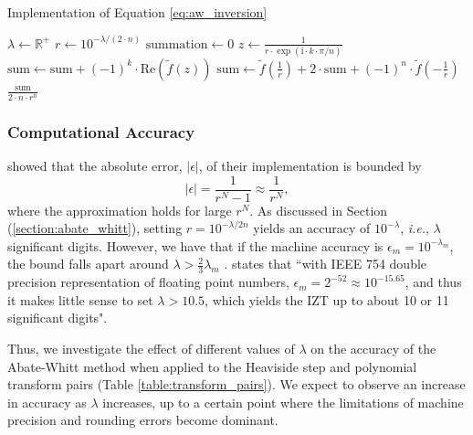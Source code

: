 \documentclass[a4paper]{report}
\begin{document}
\begin{algorithm}[H]
    \caption{Implementation of Equation \ref{eq:aw_inversion}}
    \label{algo:abate_whitt}
    \begin{algorithmic}[1]
        \State $\lambda \gets \mathbb{R}^+$
        \State $r \gets 10^{-\lambda / (2 \cdot n)}$
        \State $\text{summation} \gets 0$
            \State $z \gets \frac{1}{r \cdot \exp(\text{i} \cdot k \cdot \pi / n)}$
            \State $\text{sum} \gets \text{sum} + (-1)^k \cdot \text{Re}(\tilde{f}(z))$
        \EndFor
        \State $\text{sum} \gets \tilde{f}(\frac{1}{r}) + 2 \cdot \text{sum} + (-1)^n \cdot \tilde{f}(-\frac{1}{r})$
        \State \Return $\frac{\text{sum}}{2 \cdot n \cdot r^n}$
    \EndProcedure
    \end{algorithmic}
\end{algorithm}

\subsubsection{Computational Accuracy}\label{sec:aw_accuracy}
\citet{AbateWhitt1992a, AbateWhitt1992b} showed that the absolute error, $|\epsilon |$, of their implementation is bounded by
\begin{equation}
	| \epsilon | = \frac{1}{r^N - 1} \approx \frac{1}{r^N},
\end{equation}
where the approximation holds for large $r^N$. As discussed in Section (\ref{section:abate_whitt}), setting $r=10^{-\lambda / 2n}$  yields an accuracy of $10^{-\lambda}$, \textit{i.e.}, $\lambda$ significant digits. However, we have that if the machine accuracy is $\epsilon_m = 10^{-\lambda_m}$, the bound falls apart around $\lambda > \frac{2}{3} \lambda_m$ \citep[Remark 5.8]{AbateWhitt1992a}. \citet{loveless2023phelanguido} states that ``with IEEE 754 double precision representation of floating point numbers, $\epsilon_m = 2^{-52} \approx 10^{-15.65}$, and thus it makes little sense to set $\lambda > 10.5$, which yields the IZT up to about 10 or 11 significant digits".

Thus, we investigate the effect of different values of $\lambda$ on the accuracy of the Abate-Whitt method when applied to the Heaviside step and polynomial transform pairs (Table \ref{table:transform_pairs}). We expect to observe an increase in accuracy as $\lambda$ increases, up to a certain point where the limitations of machine precision and rounding errors become dominant.
\end{document}
